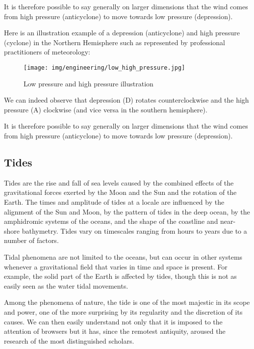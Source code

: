 	\begin{tcolorbox}[title=Remark,colframe=black,arc=10pt]
	It is therefore possible to say generally on larger dimensions that the wind comes from high pressure (anticyclone) to move towards low pressure (depression).
	\end{tcolorbox}
	Here is an illustration example of a depression (anticyclone) and high pressure (cyclone) in the Northern Hemisphere such as represented by professional practitioners of meteorology:
	\begin{figure}[H]
		\centering
		\texttt{[image: img/engineering/low\_high\_pressure.jpg]}	
		\caption{Low pressure and high pressure illustration}
	\end{figure}
	We can indeed observe that depression (D) rotates counterclockwise and the high pressure (A) clockwise (and vice versa in the southern hemisphere).
	\begin{tcolorbox}[title=Remark,colframe=black,arc=10pt]
	It is therefore possible to say generally on larger dimensions that the wind comes from high pressure (anticyclone) to move towards low pressure (depression).
	\end{tcolorbox}
	
	\pagebreak
	\subsection{Tides}
	Tides are the rise and fall of sea levels caused by the combined effects of the gravitational forces exerted by the Moon and the Sun and the rotation of the Earth. The times and amplitude of tides at a locale are influenced by the alignment of the Sun and Moon, by the pattern of tides in the deep ocean, by the amphidromic systems of the oceans, and the shape of the coastline and near-shore bathymetry. Tides vary on timescales ranging from hours to years due to a number of factors.

	Tidal phenomena are not limited to the oceans, but can occur in other systems whenever a gravitational field that varies in time and space is present. For example, the solid part of the Earth is affected by tides, though this is not as easily seen as the water tidal movements.
	
	Among the phenomena of nature, the tide is one of the most majestic in its scope and power, one of the more surprising by its regularity and the discretion of its causes. We can then easily understand not only that it is imposed to the attention of browsers but it has, since the remotest antiquity, aroused the research of the most distinguished scholars.

